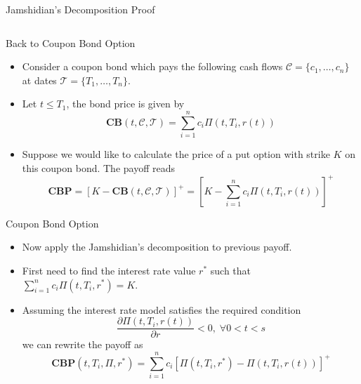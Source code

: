 \documentclass{beamer}
\begin{document}
\begin{frame}{Jamshidian's Decomposition Proof}
\begin{itemize}
\begin{columns}
	\end{columns}
\end{itemize}
\end{frame}

\begin{frame}{Back to Coupon Bond Option}
\begin{itemize}
	\item<1-> Consider a coupon bond which pays the following cash flows $\mathcal{C}=\{c_1,\dots,c_n\}$ at dates $\mathcal{T}=\{T_1,\ldots,T_n\}$.
	\item<2-> Let $t\leq T_1$, the bond price is given by
	\begin{equation*}
		\textbf{CB}(t,\mathcal{C},\mathcal{T})=\sum_{i=1}^n c_i \Pi(t, T_i, r(t))
	\end{equation*}
	\item<3-> Suppose we would like to calculate the price of a put option with strike $K$ on this coupon bond. The payoff reads
	\begin{equation*}
		\textbf{CBP}=\left[K-\textbf{CB}(t,\mathcal{C},\mathcal{T})\right]^+ = \left[K-\sum_{i=1}^n c_i \Pi(t, T_i, r(t))\right]^+
	\end{equation*}
\end{itemize}
\end{frame}

\begin{frame}{Coupon Bond Option}
\begin{itemize}
	\item<1-> Now apply the Jamshidian's decomposition to previous payoff.
	\item<2-> First need to find the interest rate value $r^*$ such that $\sum_{i=1}^n c_i \Pi(t, T_i, r^*) = K$.
	\item<3-> Assuming the interest rate model satisfies the required condition
	\begin{equation*}
		\frac{\partial \Pi(t,T_i,r(t))}{\partial r}<0,\;\forall 0<t<s
	\end{equation*}
	we can rewrite the payoff as
	\begin{equation}
		\textbf{CBP}(t,T_i,\Pi,r^*) = \sum_{i=1}^n c_i [\Pi(t, T_i, r^*)-\Pi(t, T_i, r(t))]^+
	\label{eq:bond_option_payoff}
	\end{equation}
\end{itemize}
\end{frame}
\end{document}

